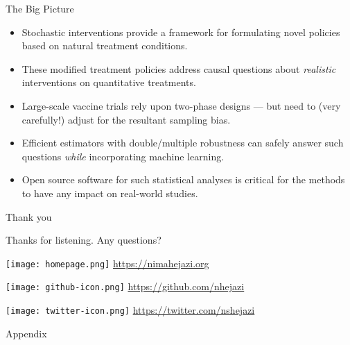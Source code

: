 \documentclass{beamer}
\begin{document}

\begin{frame}[c]{The Big Picture}

\begin{center}
\begin{itemize}
  \itemsep8pt
  \item Stochastic interventions provide a framework for formulating novel
    policies based on natural treatment conditions.
  \item These modified treatment policies address causal questions about
    \textit{realistic} interventions on quantitative treatments.
  \item Large-scale vaccine trials rely upon two-phase designs --- but need to
    (very carefully!) adjust for the resultant sampling bias.
  \item Efficient estimators with double/multiple robustness can safely answer
    such questions \textit{while} incorporating machine learning.
  \item Open source software for such statistical analyses is critical for the
    methods to have any impact on real-world studies.
\end{itemize}
\end{center}

\note{
}

\end{frame}


\begin{frame}[c]{Thank you}

\Large{Thanks for listening. Any questions?}

\vspace{2mm}
\texttt{[image: homepage.png]} \url{https://nimahejazi.org}

\vspace{2mm}
\texttt{[image: github-icon.png]}
  \url{https://github.com/nhejazi}

\vspace{2mm}
\texttt{[image: twitter-icon.png]}
  \url{https://twitter.com/nshejazi}

\end{frame}


\appendix
\begin{frame}[standout]
  Appendix
\end{frame}
\end{document}
